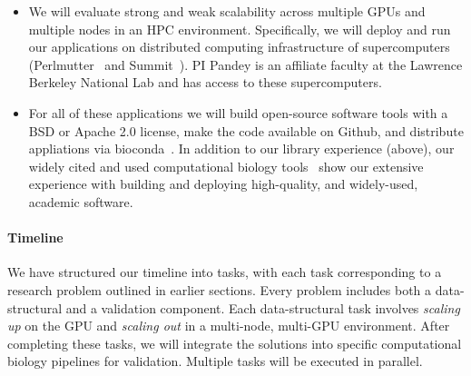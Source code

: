 \begin{itemize}
  \item We will evaluate strong and weak scalability across multiple GPUs and multiple nodes in an HPC environment. Specifically, we will deploy and run our applications on distributed computing infrastructure of supercomputers (Perlmutter~\cite{perlmutter} and Summit~\cite{summit}). PI Pandey is an affiliate faculty at the Lawrence Berkeley National Lab and has access to these supercomputers.
  \item For all of these applications we will build open-source software tools with a BSD or Apache 2.0 license, make the code available on Github, and distribute appliations via bioconda~\cite{Gr_ning_2018}. In addition to our library experience (above), our widely cited and used computational biology tools~\cite{PandeyAlBe18,PandeyBJP17,PandeyBeJo17b,PandeyBeJo18,pandey2020timely,pandey2021variantstore,pandey2021terrace,PandeyBeCo23,Patro2017Salmon,he2022alevin,He2023,Khan2022} show our extensive experience with building and deploying high-quality, and widely-used, academic software.
\end{itemize}

%

\paragraph{Timeline} 
We have structured our timeline into tasks, with each task corresponding to a research problem outlined in earlier sections. Every problem includes both a data-structural and a validation component. Each data-structural task involves \emph{scaling up} on the GPU and \emph{scaling out} in a multi-node, multi-GPU environment. After completing these tasks, we will integrate the solutions into specific computational biology pipelines for validation. Multiple tasks will be executed in parallel.

%



